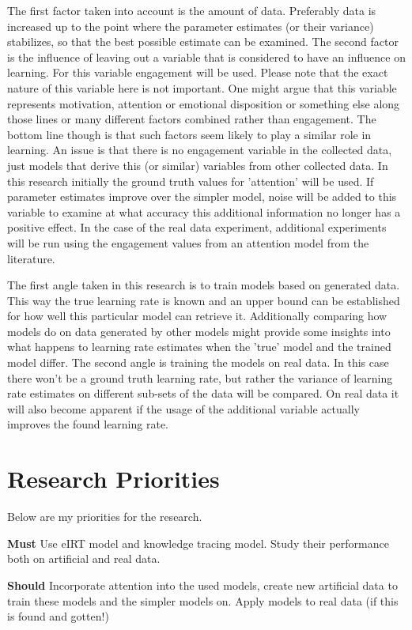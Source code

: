 \documentclass{article}
\begin{document}
The first factor taken into account is the amount of data. Preferably data is increased up to the point where the parameter estimates (or their variance) stabilizes, so that the best possible estimate can be examined. The second factor is the influence of leaving out a variable that is considered to have an influence on learning. For this variable engagement will be used. Please note that the exact nature of this variable here is not important. One might argue that this variable represents motivation, attention or emotional disposition or something else along those lines or many different factors combined rather than engagement. The bottom line though is that such factors seem likely to play a similar role in learning. An issue is that there is no engagement variable in the collected data, just models that derive this (or similar) variables from other collected data. In this research initially the ground truth values for 'attention' will be used. If parameter estimates improve over the simpler model, noise will be added to this variable to examine at what accuracy this additional information no longer has a positive effect. In the case of the real data experiment, additional experiments will be run using the engagement values from an attention model from the literature.

The first angle taken in this research is to train models based on generated data. This way the true learning rate is known and an upper bound can be established for how well this particular model can retrieve it. Additionally comparing how models do on data generated by other models might provide some insights into what happens to learning rate estimates when the 'true' model and the trained model differ. The second angle is training the models on real data. In this case there won't be a ground truth learning rate, but rather the variance of learning rate estimates on different sub-sets of the data will be compared. On real data it will also become apparent if the usage of the additional variable actually improves the found learning rate.


\section{Research Priorities}
Below are my priorities for the research.

{\bf Must} Use eIRT model and knowledge tracing model. Study their performance both on artificial and real data.

{\bf Should} Incorporate attention into the used models, create new artificial data to train these models and the simpler models on. Apply models to real data (if this is found and gotten!)
\end{document}

